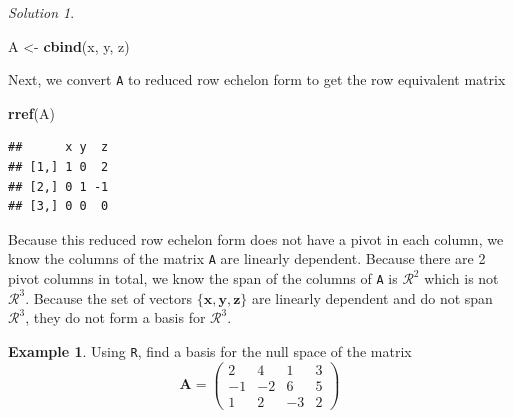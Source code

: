 \documentclass[
]{book}
\newenvironment{Shaded}{\begin{snugshade}}{\end{snugshade}}
\newcommand{\KeywordTok}[1]{\textcolor[rgb]{0.13,0.29,0.53}{\textbf{#1}}}
\newcommand{\NormalTok}[1]{#1}
\newcommand{\StringTok}[1]{\textcolor[rgb]{0.31,0.60,0.02}{#1}}
\theoremstyle{definition}
\theoremstyle{definition}
\newtheorem{example}{Example}[chapter]
\theoremstyle{definition}
\theoremstyle{definition}
\theoremstyle{remark}
\newtheorem*{solution}{Solution}
\begin{document}
\begin{solution}
\begin{Shaded}
\begin{Highlighting}[]
\NormalTok{A <-}\StringTok{ }\KeywordTok{cbind}\NormalTok{(x, y, z)}
\end{Highlighting}
\end{Shaded}

Next, we convert \texttt{A} to reduced row echelon form to get the row equivalent matrix

\begin{Shaded}
\begin{Highlighting}[]
\KeywordTok{rref}\NormalTok{(A)}
\end{Highlighting}
\end{Shaded}

\begin{verbatim}
##      x y  z
## [1,] 1 0  2
## [2,] 0 1 -1
## [3,] 0 0  0
\end{verbatim}

Because this reduced row echelon form does not have a pivot in each column, we know the columns of the matrix \texttt{A} are linearly dependent. Because there are 2 pivot columns in total, we know the span of the columns of \texttt{A} is \(\mathcal{R}^2\) which is not \(\mathcal{R}^3\). Because the set of vectors \(\{ \mathbf{x}, \mathbf{y}, \mathbf{z} \}\) are linearly dependent and do not span \(\mathcal{R}^3\), they do not form a basis for \(\mathcal{R}^3\).
\end{solution}

\begin{example}
Using \texttt{R}, find a basis for the null space of the matrix
\[
\mathbf{A} = \begin{pmatrix} 2 & 4 & 1 & 3 \\ -1 & -2 & 6 & 5 \\ 1 & 2 & -3 & 2 \end{pmatrix}
\]
\end{example}
\end{document}
